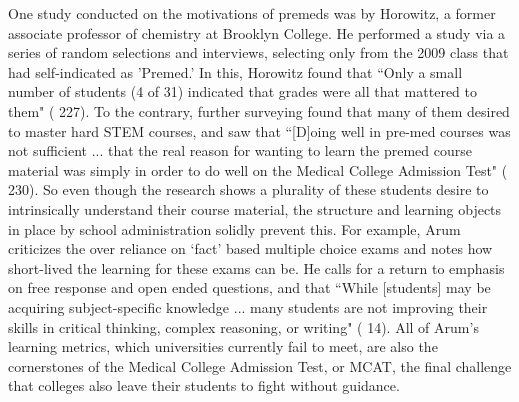\documentclass [12pt]{article}
\begin{document}
\begin{flushleft}
One study conducted on the motivations of premeds was by Horowitz, a former associate professor of chemistry at Brooklyn College. He performed a study via a series of random selections and interviews, selecting only from the 2009 class that had self-indicated as 'Premed.' In this, Horowitz found that  {``}Only a small number of students (4 of 31) indicated that grades were all that mattered to them" (\cite{Horowitz-2010} 227). To the contrary, further surveying found that many of them desired to master hard STEM courses, and saw that {``}[D]oing well in pre-med courses was not sufficient ... that the real reason for wanting to learn the premed course material was simply in order to do well on the Medical College Admission Test" (\cite{Horowitz-2010} 230). So even though the research shows a plurality of these students desire to intrinsically understand their course material, the structure and learning objects in place by school administration solidly prevent this. For example, Arum criticizes the over reliance on {`}fact' based multiple choice exams and notes how short-lived the learning for these exams can be. He calls for a return to emphasis on free response and open ended questions, and that {``}While [students] may be acquiring subject-specific knowledge ...  many students are not improving their skills in critical thinking, complex reasoning, or writing" (\cite{Arum-2011} 14). All of Arum's learning metrics, which universities currently fail to meet, are also the cornerstones of the Medical College Admission Test, or MCAT, the final challenge that colleges also leave their students to fight without guidance.


\end{flushleft}
\end{document}
